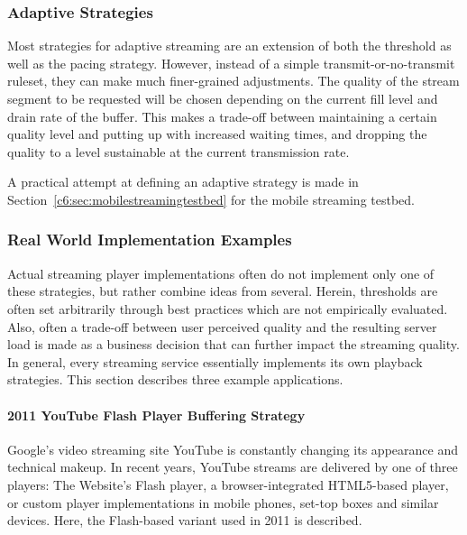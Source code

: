 \subsubsection{Adaptive Strategies}

Most strategies for adaptive streaming are an extension of both the threshold as well as the pacing strategy. However, instead of a simple transmit-or-no-transmit ruleset, they can make much finer-grained adjustments. The quality of the stream segment to be requested will be chosen depending on the current fill level and drain rate of the buffer. This makes a trade-off between maintaining a certain quality level and putting up with increased waiting times, and dropping the quality to a level sustainable at the current transmission rate.

A practical attempt at defining an adaptive strategy is made in Section~\ref{c6:sec:mobilestreamingtestbed} for the mobile streaming testbed.


\subsubsection{Real World Implementation Examples}

Actual streaming player implementations often do not implement only one of these strategies, but rather combine ideas from several. Herein, thresholds are often set arbitrarily through best practices which are not empirically evaluated. 
Also, often a trade-off between user perceived quality and the resulting server load is made as a business decision that can further impact the streaming quality. In general, every streaming service essentially implements its own playback strategies. This section describes three example applications.

\paragraph{2011 YouTube Flash Player Buffering Strategy}

Google's video streaming site YouTube is constantly changing its appearance and technical makeup. In recent years, YouTube streams are delivered by one of three players: The Website's Flash player, a browser-integrated \acrshort{HTML}5-based player, or custom player implementations in mobile phones, set-top boxes and similar devices. Here, the Flash-based variant used in 2011 is described.


